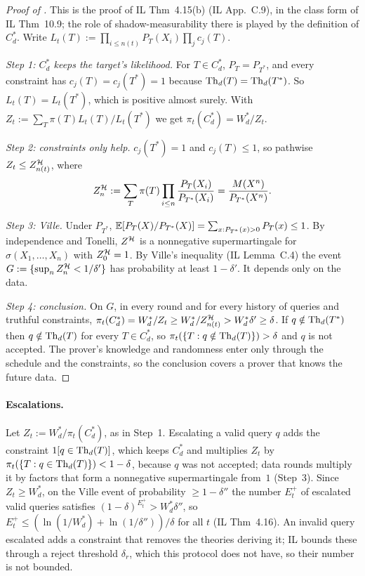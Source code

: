 \begin{proof}[Proof of ]
This is the proof of IL Thm~4.15(b) (IL App.~C.9), in the class form of IL Thm~10.9; the role of shadow-measurability there is played by the definition of $C^*_d$. Write $L_t(T):=\prod_{i\le n(t)}P_T(X_i)\prod_jc_j(T)$.

\emph{Step 1: $C^*_d$ keeps the target's likelihood.} For $T\in C^*_d$, $P_T=P_{T^*}$, and every constraint has $c_j(T)=c_j(T^*)=1$ because $\mathrm{Th}_d(T)=\mathrm{Th}_d(T^*)$. So $L_t(T)=L_t(T^*)$, which is positive almost surely. With $Z_t:=\sum_T\pi(T)L_t(T)/L_t(T^*)$ we get $\pi_t(C^*_d)=W^*_d/Z_t$.

\emph{Step 2: constraints only help.} $c_j(T^*)=1$ and $c_j(T)\le1$, so pathwise $Z_t\le Z^{\mathcal{H}}_{n(t)}$, where
\[
Z^{\mathcal{H}}_n:=\sum_T\pi(T)\prod_{i\le n}\frac{P_T(X_i)}{P_{T^*}(X_i)}=\frac{M(X^n)}{P_{T^*}(X^n)} .
\]

\emph{Step 3: Ville.} Under $P_{T^*}$, $\mathbb{E}[P_T(X)/P_{T^*}(X)]=\sum_{x:P_{T^*}(x)>0}P_T(x)\le1$. By independence and Tonelli, $Z^{\mathcal{H}}$ is a nonnegative supermartingale for $\sigma(X_1,\dots,X_n)$ with $Z^{\mathcal{H}}_0=1$. By Ville's inequality (IL Lemma~C.4) the event $G:=\{\sup_nZ^{\mathcal{H}}_n<1/\delta'\}$ has probability at least $1-\delta'$. It depends only on the data.

\emph{Step 4: conclusion.} On $G$, in every round and for every history of queries and truthful constraints, $\pi_t(C^*_d)=W^*_d/Z_t\ge W^*_d/Z^{\mathcal{H}}_{n(t)}>W^*_d\delta'\ge\delta$. If $q\notin\mathrm{Th}_d(T^*)$ then $q\notin\mathrm{Th}_d(T)$ for every $T\in C^*_d$, so $\pi_t(\{T:q\notin\mathrm{Th}_d(T)\})>\delta$ and $q$ is not accepted. The prover's knowledge and randomness enter only through the schedule and the constraints, so the conclusion covers a prover that knows the future data.
\end{proof}

\paragraph{Escalations.} Let $Z_t:=W^*_d/\pi_t(C^*_d)$, as in Step~1. Escalating a valid query $q$ adds the constraint $1[q\in\mathrm{Th}_d(T)]$, which keeps $C^*_d$ and multiplies $Z_t$ by $\pi_t(\{T:q\in\mathrm{Th}_d(T)\})<1-\delta$, because $q$ was not accepted; data rounds multiply it by factors that form a nonnegative supermartingale from~$1$ (Step~3). Since $Z_t\ge W^*_d$, on the Ville event of probability $\ge1-\delta''$ the number $E^+_t$ of escalated valid queries satisfies $(1-\delta)^{E^+_t}>W^*_d\delta''$, so $E^+_t\le(\ln(1/W^*_d)+\ln(1/\delta''))/\delta$ for all $t$ (IL Thm~4.16). An invalid query escalated adds a constraint that removes the theories deriving it; IL bounds these through a reject threshold $\delta_r$, which this protocol does not have, so their number is not bounded.

